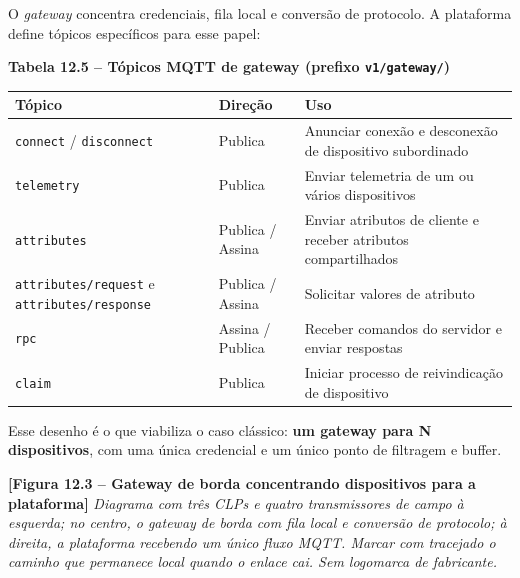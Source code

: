 O \emph{gateway} concentra credenciais, fila local e conversão de protocolo. A plataforma define tópicos específicos para esse papel:

\textbf{Tabela 12.5 -- Tópicos MQTT de gateway (prefixo \passthrough{\lstinline!v1/gateway/!})}

\begin{longtable}[]{@{}
  >{\raggedright\arraybackslash}p{}
  >{\raggedright\arraybackslash}p{}
  >{\raggedright\arraybackslash}p{}@{}}
\toprule\noalign{}
\begin{minipage}[b]{\linewidth}\raggedright
Tópico
\end{minipage} & \begin{minipage}[b]{\linewidth}\raggedright
Direção
\end{minipage} & \begin{minipage}[b]{\linewidth}\raggedright
Uso
\end{minipage} \\
\midrule\noalign{}
\endhead
\bottomrule\noalign{}
\endlastfoot
\passthrough{\lstinline!connect!} / \passthrough{\lstinline!disconnect!} & Publica & Anunciar conexão e desconexão de dispositivo subordinado \\
\passthrough{\lstinline!telemetry!} & Publica & Enviar telemetria de um ou vários dispositivos \\
\passthrough{\lstinline!attributes!} & Publica / Assina & Enviar atributos de cliente e receber atributos compartilhados \\
\passthrough{\lstinline!attributes/request!} e \passthrough{\lstinline!attributes/response!} & Publica / Assina & Solicitar valores de atributo \\
\passthrough{\lstinline!rpc!} & Assina / Publica & Receber comandos do servidor e enviar respostas \\
\passthrough{\lstinline!claim!} & Publica & Iniciar processo de reivindicação de dispositivo \\
\end{longtable}

Esse desenho é o que viabiliza o caso clássico: \textbf{um gateway para N dispositivos}, com uma única credencial e um único ponto de filtragem e buffer.

\begin{caixafigura}

\textbf{{[}Figura 12.3 -- Gateway de borda concentrando dispositivos para a plataforma{]}}
\emph{Diagrama com três CLPs e quatro transmissores de campo à esquerda; no centro, o gateway de borda com fila local e conversão de protocolo; à direita, a plataforma recebendo um único fluxo MQTT. Marcar com tracejado o caminho que permanece local quando o enlace cai. Sem logomarca de fabricante.}

\end{caixafigura}

